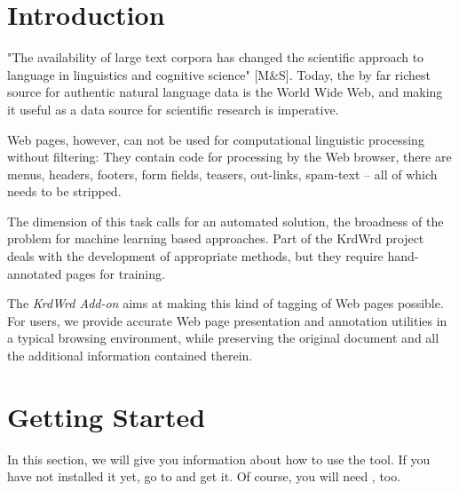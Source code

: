 \documentclass[12pt,a4paper]{article}
\title{\mytitle}
\author{\myauthor}
\begin{document}
\maketitle

\section{Introduction}


"The availability of large text corpora has changed the scientific approach to language in linguistics and cognitive science" [M\&S].
Today, the by far richest source for authentic natural language data is the World Wide Web, and making it useful as a data source for scientific research is imperative.

Web pages, however, can not be used for computational linguistic processing without filtering:
They contain code for processing by the Web browser, there are menus, headers, footers, form fields, teasers, out-links, spam-text -- all of which needs to be stripped.

The dimension of this task calls for an automated solution, the broadness of the problem for machine learning based approaches.
Part of the KrdWrd project deals with the development of appropriate methods, but they require hand-annotated pages for training.

The \textit{KrdWrd Add-on} aims at making this kind of tagging of Web pages possible.
For users, we provide accurate Web page presentation and annotation utilities in a typical browsing environment, while preserving the original document and all the additional information contained therein.


\section{Getting Started}
In this section, we will give you information about how to use the tool. If you have not installed it yet, go to  and get it. Of course, you will need , too. \\
\end{document}
